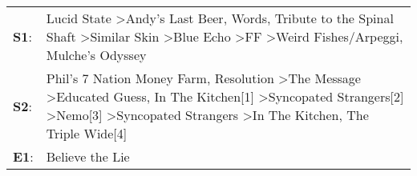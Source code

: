 \begin{supertabular}{p{0.03\textwidth}p{0.92\textwidth}}
 \textbf{S1}:  &                                                                                     Lucid State\textsuperscript{} \textgreater \enspace Andy's Last Beer\textsuperscript{}, \enspace Words\textsuperscript{}, \enspace Tribute to the Spinal Shaft\textsuperscript{} \textgreater \enspace Similar Skin\textsuperscript{} \textgreater \enspace Blue Echo\textsuperscript{} \textgreater \enspace FF\textsuperscript{} \textgreater \enspace Weird Fishes/Arpeggi\textsuperscript{}, \enspace Mulche's Odyssey\textsuperscript{}  \enspace  \\
 \textbf{S2}:  &  Phil's 7 Nation Money Farm\textsuperscript{}, \enspace Resolution\textsuperscript{} \textgreater \enspace The Message\textsuperscript{} \textgreater \enspace Educated Guess\textsuperscript{}, \enspace In The Kitchen[1]\textsuperscript{} \textgreater \enspace Syncopated Strangers[2]\textsuperscript{} \textgreater \enspace Nemo[3]\textsuperscript{} \textgreater \enspace Syncopated Strangers\textsuperscript{} \textgreater \enspace In The Kitchen\textsuperscript{}, \enspace The Triple Wide[4]\textsuperscript{}  \enspace  \\
 \textbf{E1}:  &                                                                                                                                                                                                                                                                                                                                                                                                                                                                                                Believe the Lie\textsuperscript{}  \enspace  \\
\end{supertabular}
